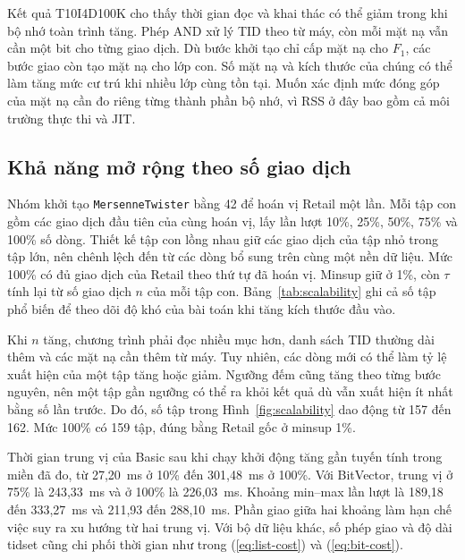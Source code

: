 Kết quả T10I4D100K cho thấy thời gian đọc và khai thác có thể giảm
trong khi bộ nhớ toàn trình tăng. Phép AND xử lý TID theo từ máy,
còn mỗi mặt nạ vẫn cần một bit cho từng giao dịch. Dù bước khởi
tạo chỉ cấp mặt nạ cho $F_1$, các bước giao còn tạo mặt nạ cho lớp
con. Số mặt nạ và kích thước của chúng có thể làm tăng mức cư trú
khi nhiều lớp cùng tồn tại. Muốn xác định mức đóng góp của mặt nạ
cần đo riêng từng thành phần bộ nhớ, vì RSS ở đây bao gồm cả môi
trường thực thi và JIT.

\subsection{Khả năng mở rộng theo số giao dịch}
Nhóm khởi tạo \texttt{MersenneTwister} bằng 42 để hoán vị Retail
một lần. Mỗi tập con gồm các giao dịch đầu tiên của cùng
hoán vị, lấy lần lượt 10\%, 25\%, 50\%, 75\% và 100\% số dòng.
Thiết kế tập con lồng nhau giữ các giao dịch của tập nhỏ trong
tập lớn, nên chênh lệch đến từ các dòng bổ sung trên cùng một
nền dữ liệu.
Mức 100\% có đủ giao dịch của Retail theo thứ tự đã hoán vị.
Minsup giữ ở 1\%, còn $\tau$ tính lại từ số giao dịch $n$ của mỗi
tập con. Bảng~\ref{tab:scalability} ghi cả số tập phổ biến để theo
dõi độ khó của bài toán khi tăng kích thước đầu vào.

\begin{table}[tb]
\centering
\caption{Trung vị thời gian đọc và khai thác sau chạy khởi động trên các tập con lồng nhau của Retail. Minsup là 1\% và giá trị khởi tạo bộ sinh là 42. Nguồn số liệu gồm CSV thực nghiệm và \texttt{results/raw/cases.json}.}
\label{tab:scalability}
\setlength{\tabcolsep}{3pt}
\TableScalability
\end{table}

Khi $n$ tăng, chương trình phải đọc nhiều mục hơn, danh sách TID
thường dài thêm và các mặt nạ cần thêm từ máy. Tuy nhiên, các dòng
mới có thể làm tỷ lệ xuất hiện của một tập tăng hoặc giảm. Ngưỡng
đếm cũng tăng theo từng bước nguyên, nên một tập gần ngưỡng có
thể ra khỏi kết quả dù vẫn xuất hiện ít nhất bằng số lần trước.
Do đó, số tập trong Hình~\ref{fig:scalability} dao động từ 157 đến
162. Mức 100\% có 159 tập, đúng bằng Retail gốc ở minsup 1\%.

Thời gian trung vị của Basic sau khi chạy khởi động tăng gần
tuyến tính trong miền đã đo, từ 27,20~ms ở 10\% đến 301,48~ms ở
100\%. Với BitVector, trung vị ở 75\% là 243,33~ms và ở 100\% là
226,03~ms. Khoảng min--max lần lượt là 189,18 đến 333,27~ms và
211,93 đến 288,10~ms. Phần giao giữa hai khoảng làm hạn chế việc
suy ra xu hướng từ hai trung vị. Với bộ dữ liệu khác, số phép
giao và độ dài tidset cũng chi phối thời gian như trong
(\ref{eq:list-cost}) và (\ref{eq:bit-cost}).

